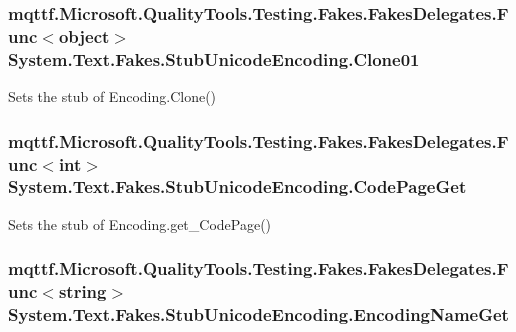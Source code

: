 \hypertarget{class_system_1_1_text_1_1_fakes_1_1_stub_unicode_encoding_a1b6c5982fd8584a497daf2d9df68790d}{
\subsubsection[{Clone01}]{\setlength{\rightskip}{0pt plus 5cm}mqttf.\-Microsoft.\-Quality\-Tools.\-Testing.\-Fakes.\-Fakes\-Delegates.\-Func$<$object$>$ System.\-Text.\-Fakes.\-Stub\-Unicode\-Encoding.\-Clone01}}\label{class_system_1_1_text_1_1_fakes_1_1_stub_unicode_encoding_a1b6c5982fd8584a497daf2d9df68790d}


Sets the stub of Encoding.\-Clone()

\hypertarget{class_system_1_1_text_1_1_fakes_1_1_stub_unicode_encoding_aa77888df9c5f6aca628312368749f94d}{
\subsubsection[{Code\-Page\-Get}]{\setlength{\rightskip}{0pt plus 5cm}mqttf.\-Microsoft.\-Quality\-Tools.\-Testing.\-Fakes.\-Fakes\-Delegates.\-Func$<$int$>$ System.\-Text.\-Fakes.\-Stub\-Unicode\-Encoding.\-Code\-Page\-Get}}\label{class_system_1_1_text_1_1_fakes_1_1_stub_unicode_encoding_aa77888df9c5f6aca628312368749f94d}


Sets the stub of Encoding.\-get\-\_\-\-Code\-Page()

\hypertarget{class_system_1_1_text_1_1_fakes_1_1_stub_unicode_encoding_a72dd5f51e827f9e0a7ab1610f28d600c}{
\subsubsection[{Encoding\-Name\-Get}]{\setlength{\rightskip}{0pt plus 5cm}mqttf.\-Microsoft.\-Quality\-Tools.\-Testing.\-Fakes.\-Fakes\-Delegates.\-Func$<$string$>$ System.\-Text.\-Fakes.\-Stub\-Unicode\-Encoding.\-Encoding\-Name\-Get}}\label{class_system_1_1_text_1_1_fakes_1_1_stub_unicode_encoding_a72dd5f51e827f9e0a7ab1610f28d600c}


